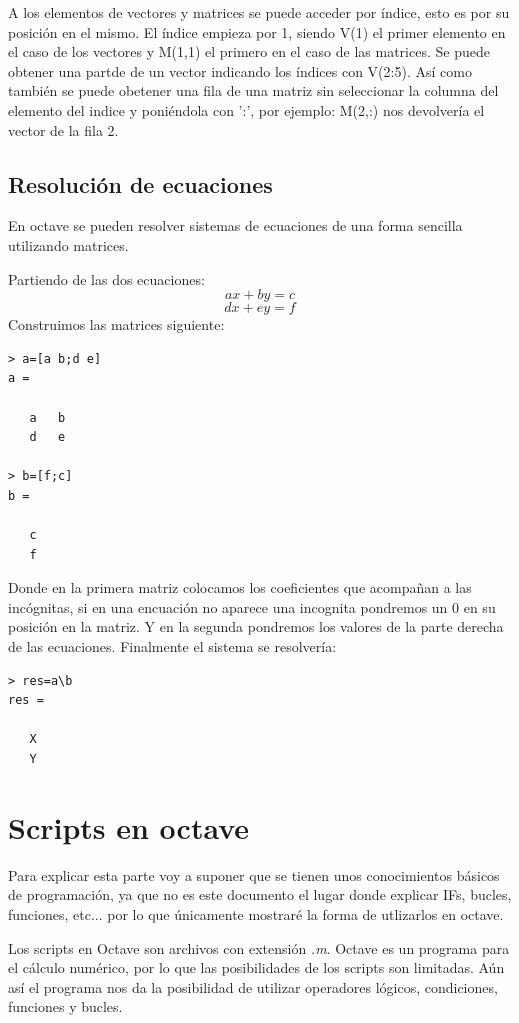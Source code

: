 \documentclass[a4,12pt,graphicx,caption,rotating]{article}
\begin{document}
A los elementos de vectores y matrices se puede acceder por índice, esto es por su posición en el mismo. El índice empieza por 1, siendo V(1) el primer elemento en el caso de los vectores y M(1,1) el primero en el caso de las matrices. Se puede obtener una partde de un vector indicando los índices con V(2:5). Así como también se puede obetener una fila de una matriz sin seleccionar la columna del elemento del indice y poniéndola con ':', por ejemplo: M(2,:) nos devolvería el vector de la fila 2.
\subsection{Resolución de ecuaciones}
En octave se pueden resolver sistemas de ecuaciones de una forma sencilla utilizando matrices.

Partiendo de las dos ecuaciones:
\begin{displaymath}
ax+by=c
\end{displaymath} 
\begin{displaymath} 
dx+ey=f
\end{displaymath} 
Construimos las matrices siguiente:
\begin{verbatim}
> a=[a b;d e]
a =

   a   b
   d   e

> b=[f;c]
b =

   c
   f
\end{verbatim}
Donde en la primera matriz colocamos los coeficientes que acompañan a las incógnitas, si en una encuación no aparece una incognita pondremos un 0 en su posición en la matriz. Y en la segunda pondremos los valores de la parte derecha de las ecuaciones. Finalmente el sistema se resolvería:
\begin{verbatim}
> res=a\b
res =

   X
   Y
\end{verbatim}
\section{Scripts en octave}
Para explicar esta parte voy a suponer que se tienen unos conocimientos básicos de programación, ya que no es este documento el lugar donde explicar IFs, bucles, funciones, etc... por lo que únicamente mostraré la forma de utlizarlos en octave.

Los scripts en Octave son archivos con extensión \emph{.m}. Octave es un programa para el cálculo numérico, por lo que las posibilidades de los scripts son limitadas. Aún así el programa nos da la posibilidad de utilizar operadores lógicos, condiciones, funciones y bucles.
\end{document}
